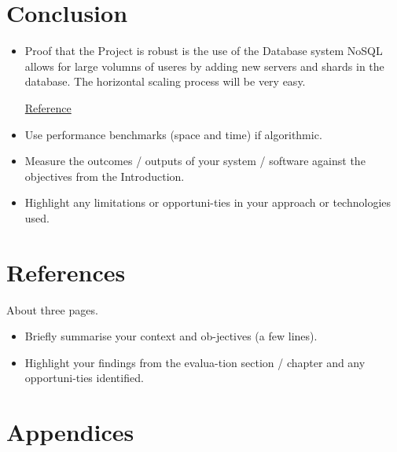 \chapter{Conclusion}
\begin{itemize}
\item  %


Proof that the Project is robust is the use of the Database system NoSQL allows for large volumns of useres by adding new servers and shards in the database. The horizontal scaling process will be very easy. 

\href{https://stackoverflow.com/questions/4386949/is-nosql-is-suitable-for-social-networking-kind-of-applications}{Reference}


\item Use performance benchmarks (space and time) if algorithmic.
\item Measure the outcomes / outputs of your system / software against the objectives from the Introduction.
\item Highlight any limitations or opportuni-ties in your approach or technologies used.
\end{itemize}

\chapter{References}
About three pages.






\begin{itemize}
\item Briefly summarise your context and ob-jectives (a few lines).
\item Highlight your findings from the evalua-tion section / chapter and any opportuni-ties identified.
\end{itemize}

\chapter{Appendices }


